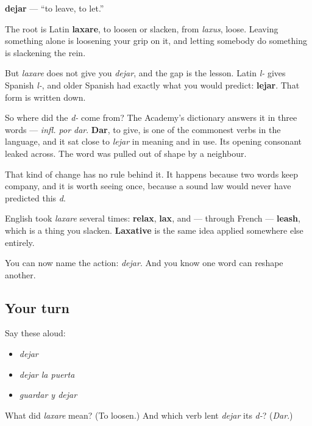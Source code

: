 \begin{cousinweb}
\textbf{dejar} — \textquotedblleft{}to leave, to let.\textquotedblright{}

The root is Latin \textbf{laxare}, to loosen or slacken, from \emph{laxus}, loose. Leaving something alone is loosening your grip on it, and letting somebody do something is slackening the rein.

But \emph{laxare} does not give you \emph{dejar}, and the gap is the lesson. Latin \emph{l-} gives Spanish \emph{l-}, and older Spanish had exactly what you would predict: \textbf{lejar}. That form is written down.

So where did the \emph{d-} come from? The Academy's dictionary answers it in three words — \emph{infl. por dar}. \textbf{Dar}, to give, is one of the commonest verbs in the language, and it sat close to \emph{lejar} in meaning and in use. Its opening consonant leaked across. The word was pulled out of shape by a neighbour.

That kind of change has no rule behind it. It happens because two words keep company, and it is worth seeing once, because a sound law would never have predicted this \emph{d}.

English took \emph{laxare} several times: \textbf{relax}, \textbf{lax}, and — through French — \textbf{leash}, which is a thing you slacken. \textbf{Laxative} is the same idea applied somewhere else entirely.
\end{cousinweb}

\begin{grammarlens}[title={What you've built}]
You can now name the action: \emph{dejar}. And you know one word can reshape another.
\end{grammarlens}

\subsection*{Your turn}
Say these aloud:

\begin{itemize}
\raggedright
  \item \emph{dejar}
  \item \emph{dejar la puerta}
  \item \emph{guardar y dejar}
\end{itemize}

\begin{tcolorbox}[breakable,colback=teal!4,colframe=teal!35!black,title={Before you move on}]
What did \emph{laxare} mean? (To loosen.) And which verb lent \emph{dejar} its \emph{d-}? (\emph{Dar}.)
\end{tcolorbox}
